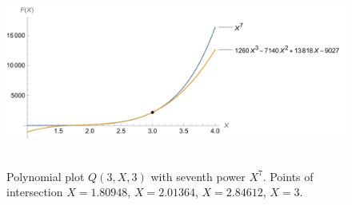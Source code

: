 ﻿\begin{figure}[H]
    \centering
    \includegraphics[width=1\textwidth]{sections/images/06_plots_polynomial_q3_n3_with_seventh}
    ~\caption{Polynomial plot $Q(3, X, 3)$ with seventh power $X^7$.
    Points of intersection $X=1.80948$, $X=2.01364$, $X=2.84612$, $X=3$.}\label{fig:figure12}
\end{figure}
